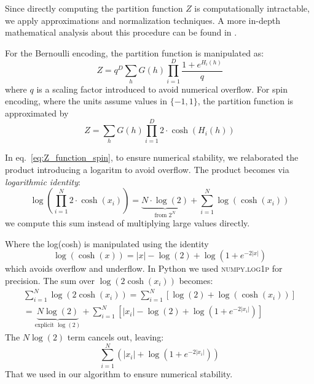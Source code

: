 \documentclass[prl,twocolumn]{revtex4-1}
\begin{document}
Since directly computing the partition function $Z$ is computationally intractable, we apply approximations and normalization techniques. A more in-depth mathematical analysis about this procedure can be found in \cite{baiesi}.

For the Bernoulli encoding, the partition function is manipulated as:
\begin{equation}
	Z = q^D\sum_{h} G(h) \prod_{i=1}^D \frac{1+e^{H_i(h)}}{q}
	\label{eq:Z_function_bernulli}
\end{equation}
where $q$ is a scaling factor introduced to avoid numerical overflow. For spin encoding, where the units assume values in $\{-1,1\}$, the partition function is approximated by
\begin{equation}
	Z = \sum_{h} G(h) \prod_{i=1}^D 2\cdot{}\cosh\left(H_i(h)\right)
	\label{eq:Z_function_spin}
\end{equation}

In eq.~\ref{eq:Z_function_spin}, to ensure numerical stability, we relaborated the product introducing a logaritm to avoid overflow.
The product becomes via \textit{logarithmic identity}:
   \begin{equation}
   \log\left(\prod_{i=1}^N 2\cdot{}\cosh(x_i)\right) = \underbrace{N\cdot{}\log(2)}_{\text{from } 2^N} +\sum_{i=1}^N \log\left(\cosh(x_i)\right)
   \end{equation}
   we compute this sum instead of multiplying large values directly.

Where the log(cosh) is manipulated using the identity
   \begin{equation}
   \log(\cosh(x)) = |x| - \log(2) + \log\left(1 + e^{-2|x|}\right)
   \end{equation}
   which avoids overflow and underflow. In Python we used \textsc{numpy.log1p} for precision.
 The sum over \( \log(2\cosh(x_i)) \) becomes:
\begin{equation}
\begin{split}
\sum_{i=1}^N \log(2\cosh(x_i)) = \sum_{i=1}^N \left[\log(2) + \log(\cosh(x_i))\right] \\
= \underbrace{N\log(2)}_{\text{explicit } \log(2)} + \sum_{i=1}^N \left[|x_i| - \log(2) + \log\left(1 + e^{-2|x_i|}\right)\right]
\end{split}
\end{equation}
The \( N\log(2) \) term cancels out, leaving:
\begin{equation}
\sum_{i=1}^N \left(|x_i| + \log\left(1 + e^{-2|x_i|}\right)\right)
\end{equation}
That we used in our algorithm to ensure numerical stability.


\end{document}
